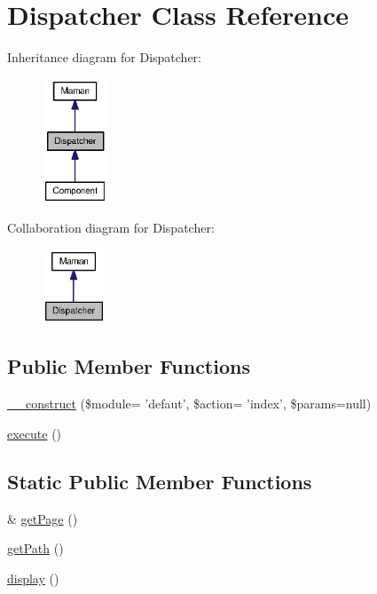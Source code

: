 \hypertarget{classDispatcher}{
\section{Dispatcher Class Reference}
\label{classDispatcher}
}
Inheritance diagram for Dispatcher:\nopagebreak
\begin{figure}[H]
\begin{center}
\leavevmode
\includegraphics[width=55pt]{classDispatcher__inherit__graph}
\end{center}
\end{figure}
Collaboration diagram for Dispatcher:\nopagebreak
\begin{figure}[H]
\begin{center}
\leavevmode
\includegraphics[width=53pt]{classDispatcher__coll__graph}
\end{center}
\end{figure}
\subsection*{Public Member Functions}
\begin{CompactItemize}
\item 
\hyperlink{classDispatcher_d9596c149149dc310c56d6b8dea95474}{\_\-\_\-construct} (\$module= 'defaut', \$action= 'index', \$params=null)
\item 
\hyperlink{classDispatcher_197c4fd2505bb88796f0dd9a2240c787}{execute} ()
\end{CompactItemize}
\subsection*{Static Public Member Functions}
\begin{CompactItemize}
\item 
\& \hyperlink{classDispatcher_b24e375f54413076199f58d15bfc16f3}{getPage} ()
\item 
\hyperlink{classDispatcher_46f96056b66e4b5c9536d19148cf9774}{getPath} ()
\item 
\hyperlink{classDispatcher_92a054ab35b0d91267d80da16d53ef9e}{display} ()
\end{CompactItemize}


